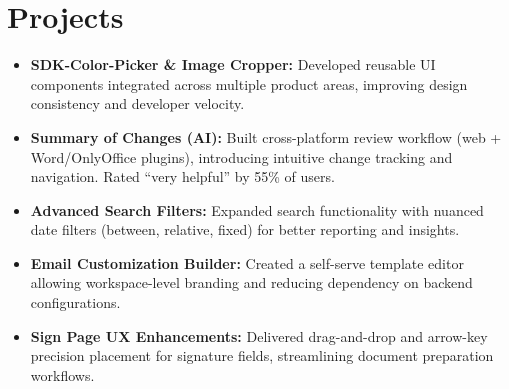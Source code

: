 \documentclass[a4paper,10pt]{article}
\begin{document}
\section*{Projects}
\begin{itemize}
    \item \textbf{SDK-Color-Picker \& Image Cropper:} Developed reusable UI components integrated across multiple product areas, improving design consistency and developer velocity.
    \item \textbf{Summary of Changes (AI):} Built cross-platform review workflow (web + Word/OnlyOffice plugins), introducing intuitive change tracking and navigation. Rated “very helpful” by 55\% of users.
    \item \textbf{Advanced Search Filters:} Expanded search functionality with nuanced date filters (between, relative, fixed) for better reporting and insights.
    \item \textbf{Email Customization Builder:} Created a self-serve template editor allowing workspace-level branding and reducing dependency on backend configurations.
    \item \textbf{Sign Page UX Enhancements:} Delivered drag-and-drop and arrow-key precision placement for signature fields, streamlining document preparation workflows.
\end{itemize}
\end{document}
